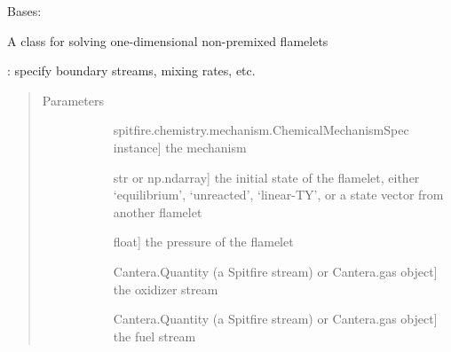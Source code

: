 \documentclass[letterpaper,10pt,english]{sphinxmanual}
\begin{document}
\begin{fulllineitems}
\label{\detokenize{spitfire.chemistry.flamelet:spitfire.chemistry.flamelet.Flamelet}}
Bases: 

A class for solving one-dimensional non-premixed flamelets

: specify boundary streams, mixing rates, etc.
\begin{quote}\begin{description}
\item[{Parameters}] \leavevmode\begin{description}
\item[{}] \leavevmode{[}spitfire.chemistry.mechanism.ChemicalMechanismSpec instance{]}
the mechanism

\item[{}] \leavevmode{[}str or np.ndarray{]}
the initial state of the flamelet, either ‘equilibrium’, ‘unreacted’, ‘linear-TY’, or a state vector from another flamelet

\item[{}] \leavevmode{[}float{]}
the pressure of the flamelet

\item[{}] \leavevmode{[}Cantera.Quantity (a Spitfire stream) or Cantera.gas object{]}
the oxidizer stream

\item[{}] \leavevmode{[}Cantera.Quantity (a Spitfire stream) or Cantera.gas object{]}
the fuel stream


\end{description}
\end{description}
\end{quote}
\end{fulllineitems}
\end{document}
